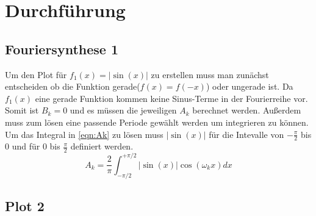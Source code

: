 \section{Durchführung}
\subsection{Fouriersynthese 1}
    Um den Plot für $f_1(x) = |\sin(x)|$ zu erstellen muss man zunächst entscheiden ob die Funktion gerade($f(x)=f(-x)$) oder ungerade ist.
    Da $f_1(x)$ eine gerade Funktion kommen keine Sinus-Terme in der Fourierreihe vor.
    Somit ist $B_k = 0$ und es müssen die jeweiligen $A_k$ berechnet werden.
    Außerdem muss zum lösen eine passende Periode gewählt werden um integrieren zu können.
    Um das Integral in \eqref{eqn:Ak} zu lösen muss $|\sin(x)|$ für die Intevalle von $-\frac{\pi}{2}$ bis 0 und für 0 bis $\frac{\pi}{2}$ definiert werden.
    \begin{equation}
        A_k = \frac{2}{\pi}\int_{-\pi/2}^{+\pi/2} |\sin(x)|\cos(\omega_k x)dx
    \end{equation}
\subsection{Plot 2}
\label{sec:Durchführung}
